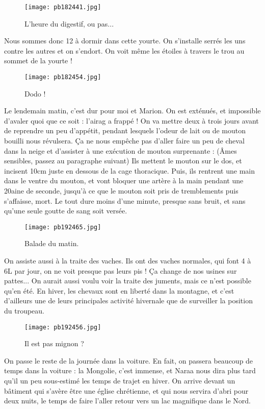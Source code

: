 \documentclass{book}
\begin{document}
\begin{figure}[h]
\centering
\texttt{[image: pb182441.jpg]}
\caption*{ L'heure du digestif, ou pas...}
\end{figure}

Nous sommes donc 12 à dormir dans cette yourte. On s'installe serrés les uns contre les autres et on s'endort. On voit même les étoiles à travers le trou au sommet de la yourte !


\begin{figure}[h]
\centering
\texttt{[image: pb182454.jpg]}
\caption*{ Dodo !}
\end{figure}

Le lendemain matin, c'est dur pour moi et Marion. On est exténués, et impossible d'avaler quoi que ce soit : l'airag a frappé ! On va mettre deux à trois jours avant de reprendre un peu d'appétit, pendant lesquels l'odeur de lait ou de mouton bouilli nous révulsera. Ça ne nous empêche pas d'aller faire un peu de cheval dans la neige et d'assister à une exécution de mouton surprenante : (Âmes sensibles, passez au paragraphe suivant) Ils mettent le mouton sur le dos, et incisent 10cm juste en dessous de la cage thoracique. Puis, ils rentrent une main dans le ventre du mouton, et vont bloquer une artère à la main pendant une 20aine de seconde, jusqu'à ce que le mouton soit pris de tremblements puis s'affaisse, mort. Le tout dure moins d'une minute, presque sans bruit, et sans qu'une seule goutte de sang soit versée.


\begin{figure}[h]
\centering
\texttt{[image: pb192465.jpg]}
\caption*{ Balade du matin.}
\end{figure}

On assiste aussi à la traite des vaches. Ils ont des vaches normales, qui font 4 à 6L par jour, on ne voit presque pas leurs pis ! Ça change de nos usines sur pattes... On aurait aussi voulu voir la traite des juments, mais ce n'est possible qu'en été. En hiver, les chevaux sont en liberté dans la montagne, et c'est d'ailleurs une de leurs principales activité hivernale que de surveiller la position du troupeau.


\begin{figure}[h]
\centering
\texttt{[image: pb192456.jpg]}
\caption*{ Il est pas mignon ?}
\end{figure}

On passe le reste de la journée dans la voiture. En fait, on passera beaucoup de temps dans la voiture : la Mongolie, c'est immense, et Naraa nous dira plus tard qu'il un peu sous-estimé les temps de trajet en hiver. On arrive devant un bâtiment qui s'avère être une église chrétienne, et qui nous servira d'abri pour deux nuits, le temps de faire l'aller retour vers un lac magnifique dans le Nord.
\end{document}
